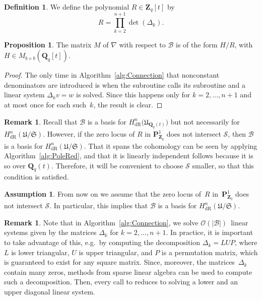 \documentclass[a4paper,11pt]{article}
\numberwithin{equation}{section}
\providecommand{\card}[1]{\lvert#1\rvert}                %
\newcommand{\ZZ}{\mathbf{Z}} %
\newcommand{\QQ}{\mathbf{Q}} %
\providecommand{\HdR}{H_{\text{dR}}}    %
\providecommand{\cB}{\mathcal{B}} %
\providecommand{\BigOh}{\mathcal{O}}          %
\theoremstyle{definition}
\newtheorem{prop}[thm]{Proposition}
\newtheorem{defn}[thm]{Definition}
\newtheorem{rem}[thm]{Remark}
\newtheorem{assump}[thm]{Assumption}
\begin{document}
\begin{defn} \label{defn:resultant}
We define the polynomial $R \in \ZZ_q[t]$ by
\[
R = \prod_{k=2}^{n+1}  \det(\Delta_k).
\]
\end{defn}

\begin{prop} \label{thm:denom}
The matrix $M$ of $\nabla$ with respect to $\cB$ is of the form
$H/R$, with $H \in M_{b \times b}(\QQ_q[t])$.
\end{prop}

\begin{proof}
The only time in Algorithm~\ref{alg:Connection} that nonconstant denominators 
are introduced is when the subroutine {} calls its subroutine 
{} and a linear system $\Delta_k v = w$ is solved. Since this 
happens only for $k=2, \dotsc, n+1$ and at most once for each 
such~$k$, the result is clear.
\end{proof}

\begin{rem}
Recall that $\cB$ is a basis for $\HdR^n\bigl(\mathfrak{U}_{\QQ_q(t)}\bigr)$ 
but not necessarily for $\HdR^n(\mathfrak{U}/\mathfrak{S})$. However, if the 
zero locus of $R$ in $\mathbf{P}^1_{\ZZ_q}$ does not intersect $\mathcal{S}$, 
then $\cB$ is a basis for $\HdR^n(\mathfrak{U}/\mathfrak{S})$. That it 
spans the cohomology can be seen by applying Algorithm~\ref{alg:PoleRed}, and that it 
is linearly independent follows because it is so over $\QQ_q(t)$. Therefore, it will 
be convenient to choose $\mathcal{S}$ smaller, so that this condition is satisfied. 
\end{rem}

\begin{assump} \label{assump:R}
From now on we assume that the zero locus of~$R$ in~$\mathbf{P}^1_{\ZZ_q}$ 
does not intersect $\mathcal{S}$. In particular, this implies that $\cB$ is 
a basis for $\HdR^n(\mathfrak{U}/\mathfrak{S})$.
\end{assump}

\begin{rem}
Note that in Algorithm~\ref{alg:Connection}, we solve $\BigOh(\card{\cB})$~linear 
systems given by the matrices $\Delta_k$ for $k = 2, \dotsc, n+1$.  In practice, 
it is important to take advantage of this, e.g.\ by computing the decomposition 
$\Delta_k = LUP$, where $L$ is lower triangular, $U$ is upper triangular, and 
$P$ is a permutation matrix, which is guaranteed to exist for any square matrix. 
Since, moreover, the matrices~$\Delta_k$ contain many zeros, methods from sparse 
linear algebra can be used to compute such a decomposition.  Then, every call to 
{} reduces to solving a lower and an upper diagonal linear system.
\end{rem}
\end{document}
